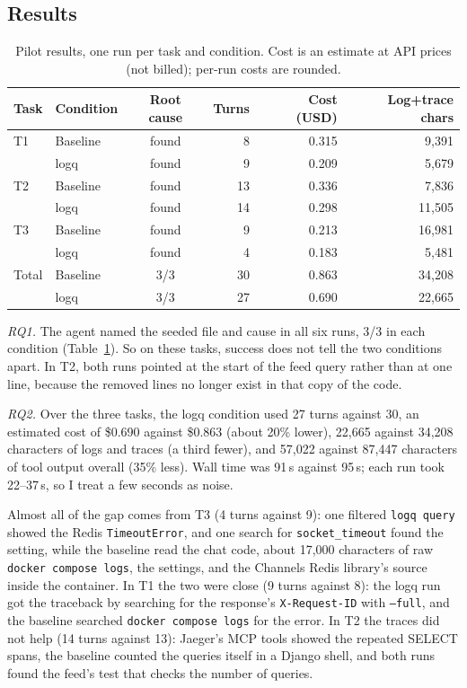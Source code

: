 \documentclass[10pt,conference]{IEEEtran}
\newcommand{\cmd}[1]{\texttt{#1}}
\begin{document}
\subsection{Results}

\begin{table}[t]
\caption{Pilot results, one run per task and condition. Cost is an estimate at API prices (not billed); per-run costs are rounded.}\label{tab:results}
\centering\footnotesize\setlength{\tabcolsep}{3.8pt}
\begin{tabular}{llcrrr}
\hline
\textbf{Task} & \textbf{Condition} & \textbf{Root cause} & \textbf{Turns} & \textbf{Cost (USD)} & \textbf{Log+trace chars} \\
\hline
T1 & Baseline & found & 8 & 0.315 & 9,391 \\
 & logq & found & 9 & 0.209 & 5,679 \\
T2 & Baseline & found & 13 & 0.336 & 7,836 \\
 & logq & found & 14 & 0.298 & 11,505 \\
T3 & Baseline & found & 9 & 0.213 & 16,981 \\
 & logq & found & 4 & 0.183 & 5,481 \\
\hline
Total & Baseline & 3/3 & 30 & 0.863 & 34,208 \\
 & logq & 3/3 & 27 & 0.690 & 22,665 \\
\hline
\end{tabular}
\end{table}

\emph{RQ1.} The agent named the seeded file and cause in all six runs, 3/3 in each condition (Table~\ref{tab:results}). So on these tasks, success does not tell the two conditions apart. In T2, both runs pointed at the start of the feed query rather than at one line, because the removed lines no longer exist in that copy of the code.

\emph{RQ2.} Over the three tasks, the logq condition used 27 turns against 30, an estimated cost of \$0.690 against \$0.863 (about 20\% lower), 22,665 against 34,208 characters of logs and traces (a third fewer), and 57,022 against 87,447 characters of tool output overall (35\% less). Wall time was 91\,s against 95\,s; each run took 22--37\,s, so I treat a few seconds as noise.

Almost all of the gap comes from T3 (4 turns against 9): one filtered \cmd{logq query} showed the Redis \cmd{TimeoutError}, and one search for \cmd{socket\_timeout} found the setting, while the baseline read the chat code, about 17,000 characters of raw \cmd{docker compose logs}, the settings, and the Channels Redis library's source inside the container. In T1 the two were close (9 turns against 8): the logq run got the traceback by searching for the response's \cmd{X-Request-ID} with \cmd{--full}, and the baseline searched \cmd{docker compose logs} for the error. In T2 the traces did not help (14 turns against 13): Jaeger's MCP tools showed the repeated SELECT spans, the baseline counted the queries itself in a Django shell, and both runs found the feed's test that checks the number of queries.
\end{document}
